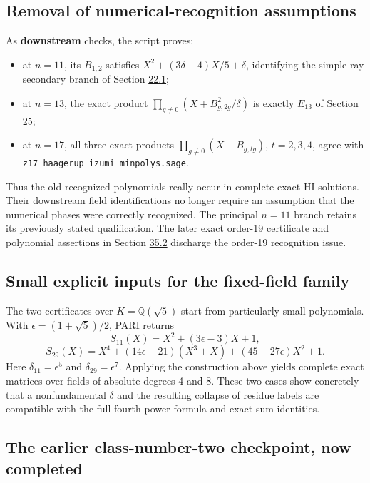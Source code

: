 \documentclass[11pt,reqno]{amsart}
\theoremstyle{plain}
\begin{document}
\subsection{Removal of numerical-recognition assumptions}\label{sec:29.2}

As \textbf{downstream} checks, the script proves:

\begin{itemize}
\item at \(n=11\), its \(B_{1,2}\) satisfies
\(X^2+(3\delta-4)X/5+\delta\), identifying the simple-ray secondary
branch of Section \hyperref[sec:22.1]{22.1};
\item at \(n=13\), the exact product
\(\prod_{g\ne0}(X+B_{g,2g}^2/\delta)\) is exactly \(E_{13}\) of
Section \hyperref[sec:25]{25};
\item at \(n=17\), all three exact products
\(\prod_{g\ne0}(X-B_{g,tg})\), \(t=2,3,4\), agree with
\texttt{z17\_\allowbreak haagerup\_\allowbreak izumi\_\allowbreak minpolys.sage}.
\end{itemize}

Thus the old recognized polynomials really occur in complete exact
HI solutions. Their downstream field identifications no longer require
an assumption that the numerical phases were correctly recognized.
The principal \(n=11\) branch retains its previously stated
qualification. The later exact order-19 certificate and polynomial
assertions in Section \hyperref[sec:35.2]{35.2} discharge the order-19 recognition issue.

\subsection{Small explicit inputs for the fixed-field family}\label{sec:29.3}

The two certificates over \(K=\mathbb Q(\sqrt5)\) start from particularly
small polynomials. With \(\epsilon=(1+\sqrt5)/2\), PARI returns
\[
 S_{11}(X)=X^2+(3\epsilon-3)X+1,
\]
\[
 S_{29}(X)=X^4+(14\epsilon-21)(X^3+X)
                    +(45-27\epsilon)X^2+1.
\]
Here \(\delta_{11}=\epsilon^5\) and
\(\delta_{29}=\epsilon^7\). Applying the construction above yields
complete exact matrices over fields of absolute degrees 4 and 8.
These two cases show concretely that a nonfundamental \(\delta\) and
the resulting collapse of residue labels are compatible with the
full fourth-power formula and exact sum identities.

\subsection{The earlier class-number-two checkpoint, now completed}\label{sec:29.4}
\end{document}
